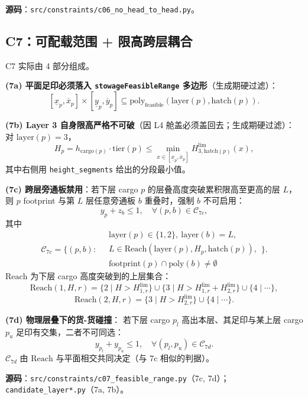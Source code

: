 \documentclass[a4paper,11pt]{ctexart}
\newcommand{\set}[1]{\mathcal{#1}}
\begin{document}
\textbf{源码}：\texttt{src/constraints/c06\_no\_head\_to\_head.py}。

\subsection{C7：可配载范围 + 限高跨层耦合}\label{sec:c7}

C7 实际由 4 部分组成。

\textbf{(7a) 平面足印必须落入 \texttt{stowageFeasibleRange} 多边形}（生成期硬过滤）：
\[
[\underline{x}_p,\overline{x}_p]\times[\underline{y}_p,\overline{y}_p] \subseteq
\text{poly}_{\text{feasible}}(\text{layer}(p),\text{hatch}(p)).
\]

\textbf{(7b) Layer 3 自身限高严格不可破}（因 L4 舱盖必须盖回去；生成期硬过滤）：
对 $\text{layer}(p)=3$，
\[
H_p = h_{\text{cargo}(p)}\cdot\text{tier}(p) \leq
\min_{x\in[\underline{x}_p,\overline{x}_p]} H^{\text{lim}}_{3,\text{hatch}(p)}(x),
\]
其中右侧用 \texttt{height\_segments} 给出的分段最小值。

\textbf{(7c) 跨层旁通板禁用}：若下层 cargo $p$ 的层叠高度突破累积限高至更高的层 $L$，
则 $p$ footprint 与第 $L$ 层任意旁通板 $b$ 重叠时，强制 $b$ 不可启用：
\begin{equation}
y_p + z_b \leq 1, \quad
\forall (p,b)\in \set{C}_{7c},
\end{equation}
其中
\[
\set{C}_{7c}=\bigg\{ (p,b):\
\begin{aligned}
&\text{layer}(p)\in\{1,2\},\ \text{layer}(b) = L,\\
&L\in \mathrm{Reach}(\text{layer}(p),H_p,\text{hatch}(p)),\\
&\text{footprint}(p)\cap\text{poly}(b)\neq\emptyset
\end{aligned}\bigg\}.
\]
$\mathrm{Reach}$ 为下层 cargo 高度突破到的上层集合：
\[
\mathrm{Reach}(1,H,r)=\{2 \mid H>H^{\text{lim}}_{1,r}\}\cup
\{3 \mid H>H^{\text{lim}}_{1,r}+H^{\text{lim}}_{2,r}\}\cup\{4\mid \cdots\},
\]
\[
\mathrm{Reach}(2,H,r)=\{3\mid H>H^{\text{lim}}_{2,r}\}\cup\{4\mid \cdots\}.
\]

\textbf{(7d) 物理层叠下的货-货碰撞}：
若下层 cargo $p_l$ 高出本层、其足印与某上层 cargo $p_u$ 足印有交集，二者不可同选：
\begin{equation}
y_{p_l} + y_{p_u} \leq 1, \quad
\forall (p_l,p_u)\in\set{C}_{7d}.
\end{equation}
$\set{C}_{7d}$ 由 $\mathrm{Reach}$ 与平面相交共同决定（与 7c 相似的判据）。

\textbf{源码}：\texttt{src/constraints/c07\_feasible\_range.py}（7c, 7d）；
\texttt{candidate\_layer*.py}（7a, 7b）。
\end{document}
